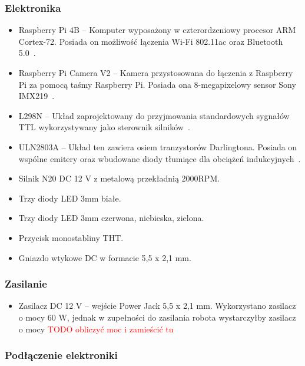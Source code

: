 \subsubsection{Elektronika}
    \begin{itemize}
        \item Raspberry Pi 4B -- Komputer wyposażony w czterordzeniowy procesor ARM Cortex-72. Posiada on możliwość łączenia Wi-Fi 802.11ac oraz Bluetooth 5.0~\cite{malina}.
        \item Raspberry Pi Camera V2 -- Kamera przystosowana do łączenia z Raspberry Pi za pomocą taśmy Raspberry Pi. Posiada ona 8-megapixelowy sensor Sony IMX219~\cite{malina}.
        \item L298N -- Układ zaprojektowany do przyjmowania standardowych sygnałów TTL wykorzystywany jako sterownik silników~\cite{L298}.
        \item ULN2803A -- Układ ten zawiera osiem tranzystorów Darlingtona. Posiada on wspólne emitery oraz wbudowane diody tłumiące dla obciążeń indukcyjnych~\cite{ULN2803a}.
        \item Silnik N20 DC 12 V z metalową przekładnią 2000RPM.
        \item Trzy diody LED 3mm białe.
        \item Trzy diody LED 3mm czerwona, niebieska, zielona.
        \item Przycisk monostabliny THT.
        \item Gniazdo wtykowe DC w formacie 5,5 x 2,1 mm.
    \end{itemize}


\subsubsection{Zasilanie}
\begin{itemize}
    \item Zasilacz DC 12 V -- wejście Power Jack 5,5 x 2,1 mm. Wykorzystano zasilacz o mocy 60 W, jednak w zupełności do zasilania robota wystarczyłby zasilacz o mocy \textcolor{red}{TODO obliczyć moc i zamieścić tu}
\end{itemize}

\subsubsection{Podłączenie elektroniki}

